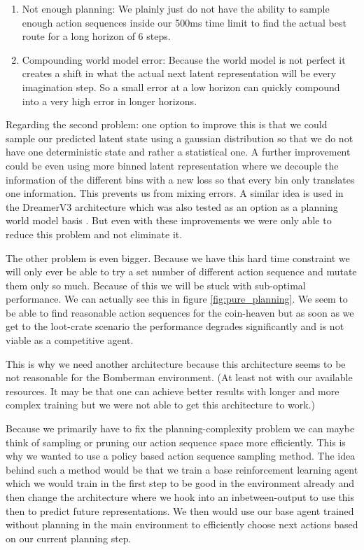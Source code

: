 \begin{enumerate}
    \item Not enough planning: We plainly just do not have the ability to sample enough action sequences inside our 500ms time limit to find the actual best route for a long horizon of 6 steps.
    \item Compounding world model error: Because the world model is not perfect it creates a shift in what the actual next latent representation will be every imagination step. So a small error at a low horizon can quickly compound into a very high error in longer horizons.
\end{enumerate}

Regarding the second problem: one option to improve this is that we could sample our predicted latent state using a gaussian distribution so that we do not have one deterministic state and rather a statistical one. A further improvement could be even using more binned latent representation where we decouple the information of the different bins with a new loss so that every bin only translates one information. This prevents us from mixing errors. A similar idea is used in the DreamerV3 architecture which was also tested as an option as a planning world model basis \cite{hafner2023dreamerv3}. But even with these improvements we were only able to reduce this problem and not eliminate it.

The other problem is even bigger. Because we have this hard time constraint we will only ever be able to try a set number of different action sequence and mutate them only so much. Because of this we will be stuck with sub-optimal performance. We can actually see this in figure \ref{fig:pure_planning}. We seem to be able to find reasonable action sequences for the coin-heaven but as soon as we get to the loot-crate scenario the performance degrades significantly and is not viable as a competitive agent.

This is why we need another architecture because this architecture seems to be not reasonable for the Bomberman environment. (At least not with our available resources. It may be that one can achieve better results with longer and more complex training but we were not able to get this architecture to work.)

Because we primarily have to fix the planning-complexity problem we can maybe think of sampling or pruning our action sequence space more efficiently. This is why we wanted to use a policy based action sequence sampling method. The idea behind such a method would be that we train a base reinforcement learning agent which we would train in the first step to be good in the environment already and then change the architecture where we hook into an inbetween-output to use this then to predict future representations. We then would use our base agent trained without planning in the main environment to efficiently choose next actions based on our current planning step.

